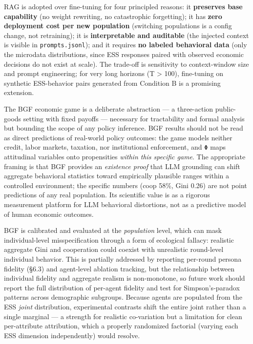 RAG is adopted over fine-tuning for four principled reasons: it \textbf{preserves base capability} (no weight rewriting, no catastrophic forgetting); it has \textbf{zero deployment cost per new population} (switching populations is a config change, not retraining); it is \textbf{interpretable and auditable} (the injected context is visible in \texttt{prompts.jsonl}); and it requires \textbf{no labeled behavioral data} (only the microdata distributions, since ESS responses paired with observed economic decisions do not exist at scale). The trade-off is sensitivity to context-window size and prompt engineering; for very long horizons (T > 100), fine-tuning on synthetic ESS-behavior pairs generated from Condition B is a promising extension.


The BGF economic game is a deliberate abstraction — a three-action public-goods setting with fixed payoffs — necessary for tractability and formal analysis but bounding the scope of any policy inference. BGF results should not be read as direct predictions of real-world policy outcomes: the game models neither credit, labor markets, taxation, nor institutional enforcement, and \texttt{Φ} maps attitudinal variables onto propensities \textit{within this specific game}. The appropriate framing is that BGF provides an \textit{existence proof} that LLM grounding can shift aggregate behavioral statistics toward empirically plausible ranges within a controlled environment; the specific numbers (coop 58\%, Gini 0.26) are not point predictions of any real population. Its scientific value is as a rigorous measurement platform for LLM behavioral distortions, not as a predictive model of human economic outcomes.


BGF is calibrated and evaluated at the \textit{population} level, which can mask individual-level misspecification through a form of ecological fallacy: realistic aggregate Gini and cooperation could coexist with unrealistic round-level individual behavior. This is partially addressed by reporting per-round persona fidelity (§6.3) and agent-level ablation tracking, but the relationship between individual fidelity and aggregate realism is non-monotone, so future work should report the full distribution of per-agent fidelity and test for Simpson's-paradox patterns across demographic subgroups. Because agents are populated from the ESS \textit{joint} distribution, experimental contrasts shift the entire joint rather than a single marginal — a strength for realistic co-variation but a limitation for clean per-attribute attribution, which a properly randomized factorial (varying each ESS dimension independently) would resolve.

